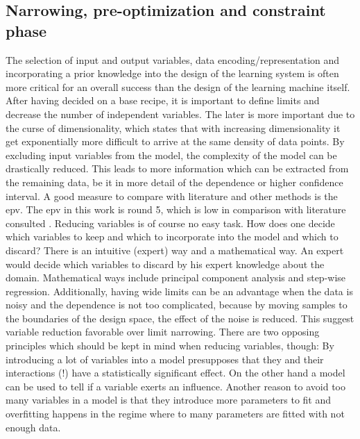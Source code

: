 \subsection{Narrowing, pre-optimization and constraint phase}
\label{sec:phase2}
The selection of input and output variables, data encoding/representation and incorporating a prior knowledge into the design of the learning system is often more critical for an overall success than the design of the learning machine itself.\cite{cherkassky1998learning} %
After having decided on a base recipe, it is important to define limits and decrease the number of independent variables. 
The later is more important due to the curse of dimensionality\cite{cherkassky1998learning}, 
which states that with increasing dimensionality it get exponentially more difficult to arrive at the same density of data points. 
By excluding input variables from the model, 
the complexity of the model can be drastically reduced. 
This leads to more information which can be extracted from the remaining data, 
be it in more detail of the dependence or higher confidence interval. 
A good measure to compare with literature and other methods is the \gls{epv}. 
The \gls{epv} in this work is round 5,
which is low in comparison with literature consulted
\cite{
ahmed2017preparation,
fernandes2010multi,
kaczmarowski2015genetic,
mahdavi2017hardness,
soltanali2014neural,
panwar2014design,
schubert2008design,
shanaghi2013experimental}.
Reducing variables is of course no easy task.
How does one decide which variables to keep and which to incorporate into the model and which to discard? 
There is an intuitive (expert) way and a mathematical way.
An expert would decide which variables to discard by his expert knowledge about the domain. 
Mathematical ways include principal component analysis and step-wise regression.
%
Additionally, having wide limits can be an advantage when the data is noisy and the dependence is not too complicated, because by moving samples to the boundaries of the design space, the effect of the noise is reduced\cite{giunta2003overview}. 
This suggest variable reduction favorable over limit narrowing.
%
There are two opposing principles which should be kept in mind when reducing variables, though:
By introducing a lot of variables into a model presupposes that they and their interactions (!) have a statistically significant effect\cite{gunst2009fractional}.
On the other hand a model can be used to tell if a variable exerts an influence\cite{haertler2014statistisch}. 
%
Another reason to avoid too many variables in a model is that they introduce more parameters to fit and overfitting happens in the regime where to many parameters are fitted with not enough data.

